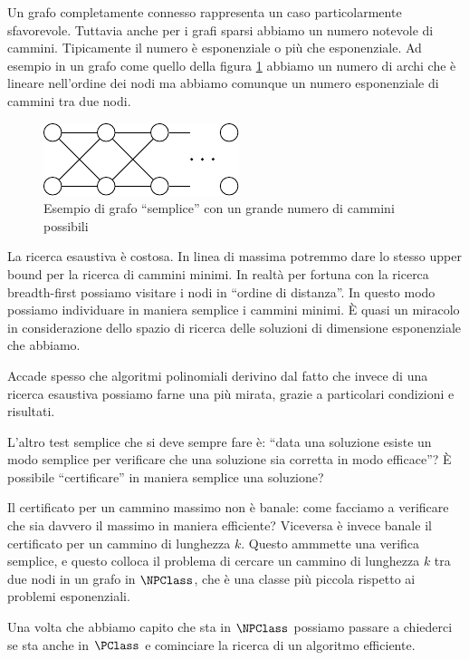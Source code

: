 Un grafo completamente connesso rappresenta un caso particolarmente sfavorevole. Tuttavia anche per
i grafi sparsi abbiamo un numero notevole di cammini. Tipicamente il numero è esponenziale o più
che esponenziale. Ad esempio in un grafo come quello della figura \ref{PathsNumber} abbiamo un
numero di archi che è lineare nell'ordine dei nodi ma abbiamo comunque un numero esponenziale di
cammini tra due nodi.

\begin{figure}[h]
    \begin{center}
        \includegraphics{./img/complexity_intro/ExponentialPathsNumber.pdf}
    \end{center}
    \caption{Esempio di grafo ``semplice'' con un grande numero di cammini possibili}
    \label{PathsNumber}
\end{figure}

La ricerca esaustiva è costosa. In linea di massima potremmo dare lo stesso upper bound per la
ricerca di cammini minimi. In realtà per fortuna con la ricerca breadth-first possiamo visitare i
nodi in ``ordine di distanza''. In questo modo possiamo individuare in maniera semplice i cammini
minimi. È quasi un miracolo in considerazione dello spazio di ricerca delle soluzioni di dimensione
esponenziale che abbiamo. 

Accade spesso che algoritmi polinomiali derivino dal fatto che invece di una ricerca esaustiva
possiamo farne una più mirata, grazie a particolari condizioni e risultati.

L'altro test semplice che si deve sempre fare è: ``data una soluzione esiste un modo semplice per
verificare che una soluzione sia corretta in modo efficace''? È possibile ``certificare'' in maniera
semplice una soluzione?

Il certificato per un cammino massimo non è banale: come facciamo a verificare che sia davvero il
massimo in maniera efficiente? Viceversa è invece banale il certificato per un cammino di lunghezza
$k$. Questo ammmette una verifica semplice, e questo colloca il problema di cercare un cammino di
lunghezza $k$ tra due nodi in un grafo in $\NPClass$, che è una classe più piccola rispetto ai problemi
esponenziali.

Una volta che abbiamo capito che sta in $\NPClass$ possiamo passare a chiederci se sta anche in
$\PClass$ e cominciare la ricerca di un algoritmo efficiente.

